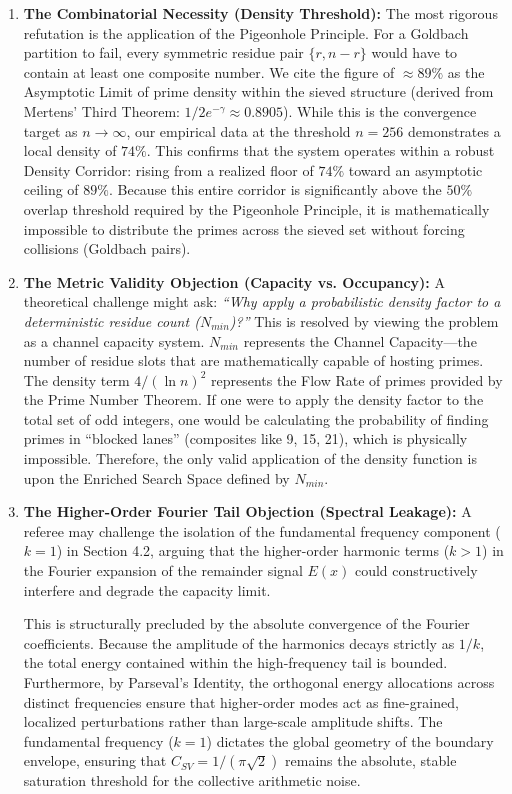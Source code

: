 \documentclass[twoside,9pt]{extarticle}
\begin{document}
\begin{enumerate}
    \item \textbf{The Combinatorial Necessity (Density Threshold):}
    The most rigorous refutation is the application of the Pigeonhole Principle. For a Goldbach partition to fail, every symmetric residue pair $\{r, n-r\}$ would have to contain at least one composite number. We cite the figure of $\approx 89\%$ as the Asymptotic Limit of prime density within the sieved structure (derived from Mertens' Third Theorem: $1 / 2e^{-\gamma} \approx 0.8905$). While this is the convergence target as $n \to \infty$, our empirical data at the threshold $n=256$ demonstrates a local density of $74\%$. This confirms that the system operates within a robust Density Corridor: rising from a realized floor of $74\%$ toward an asymptotic ceiling of $89\%$. Because this entire corridor is significantly above the $50\%$ overlap threshold required by the Pigeonhole Principle, it is mathematically impossible to distribute the primes across the sieved set without forcing collisions (Goldbach pairs).

    \item \textbf{The Metric Validity Objection (Capacity vs. Occupancy):}
    A theoretical challenge might ask: \textit{``Why apply a probabilistic density factor to a deterministic residue count ($N_{min}$)?''} This is resolved by viewing the problem as a channel capacity system. $N_{min}$ represents the Channel Capacity—the number of residue slots that are mathematically capable of hosting primes. The density term $4/(\ln n)^2$ represents the Flow Rate of primes provided by the Prime Number Theorem. If one were to apply the density factor to the total set of odd integers, one would be calculating the probability of finding primes in ``blocked lanes'' (composites like 9, 15, 21), which is physically impossible. Therefore, the only valid application of the density function is upon the Enriched Search Space defined by $N_{min}$.

    \item \textbf{The Higher-Order Fourier Tail Objection (Spectral Leakage):}
    A referee may challenge the isolation of the fundamental frequency component ($k=1$) in Section 4.2, arguing that the higher-order harmonic terms ($k > 1$) in the Fourier expansion of the remainder signal $E(x)$ could constructively interfere and degrade the capacity limit. 
    
    This is structurally precluded by the absolute convergence of the Fourier coefficients. Because the amplitude of the harmonics decays strictly as $1/k$, the total energy contained within the high-frequency tail is bounded. Furthermore, by Parseval's Identity, the orthogonal energy allocations across distinct frequencies ensure that higher-order modes act as fine-grained, localized perturbations rather than large-scale amplitude shifts. The fundamental frequency ($k=1$) dictates the global geometry of the boundary envelope, ensuring that $C_{SV} = 1/(\pi\sqrt{2})$ remains the absolute, stable saturation threshold for the collective arithmetic noise.
\end{enumerate}
\end{document}
